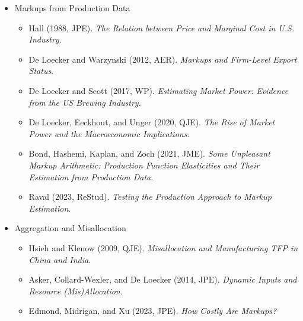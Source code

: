 \documentclass[11pt]{article}
\begin{document}
\begin{itemize}
\begin{itemize}
\item Doraszelski and Li (2025, WP). \textit{Production Function Estimation without Invertibility: Imperfectly Competitive Environments and Demand Shocks}.
\item Jaumandreu (2025, WP). \textit{Robust Production Function Estimation when there is Market Power}.
\end{itemize}
\item Markups from Production Data
\begin{itemize}
\item Hall (1988, JPE). \textit{The Relation between Price and Marginal Cost in U.S. Industry}.
\item De Loecker and Warzynski (2012, AER). \textit{Markups and Firm-Level Export Status}.
\item De Loecker and Scott (2017, WP). \textit{Estimating Market Power: Evidence from the US Brewing Industry}.
\item De Loecker, Eeckhout, and Unger (2020, QJE). \textit{The Rise of Market Power and the Macroeconomic Implications}.
\item Bond, Hashemi, Kaplan, and Zoch (2021, JME). \textit{Some Unpleasant Markup Arithmetic: Production Function Elasticities and Their Estimation from Production Data}.
\item Raval (2023, ReStud). \textit{Testing the Production Approach to Markup Estimation}.
\end{itemize}
\item Aggregation and Misallocation
\begin{itemize}
\item Hsieh and Klenow (2009, QJE). \textit{Misallocation and Manufacturing TFP in China and India}.
\item Asker, Collard-Wexler, and De Loecker (2014, JPE). \textit{Dynamic Inputs and Resource (Mis)\allowbreak{}Allocation}.
\item Edmond, Midrigan, and Xu (2023, JPE). \textit{How Costly Are Markups?}
\end{itemize}
\end{itemize}
\end{document}
